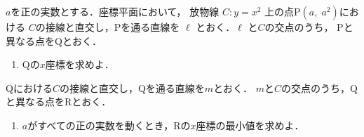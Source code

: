 ﻿\documentclass[../../../uem_mat_tok_q.tex]{subfiles}
\begin{document}
    $a$を正の実数とする．座標平面において，%
    放物線 $C\colon y=x^2$ 上の点P$(a,\;a^2)$における%
    $C$の接線と直交し，Pを通る直線を $\ell$ とおく．$\ell$ と$C$の交点のうち，%
    Pと異なる点をQとおく．

    \begin{enumerate}
        \item Qの$x$座標を求めよ．
    \end{enumerate}

    Qにおける$C$の接線と直交し，Qを通る直線を$m$とおく．%
    $m$と$C$の交点のうち，Qと異なる点をRとおく．

    \begin{enumerate}[resume]
        \item $a$がすべての正の実数を動くとき，Rの$x$座標の最小値を求めよ．
    \end{enumerate}
\end{document}
